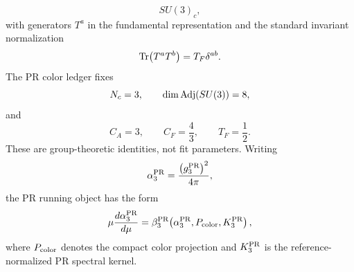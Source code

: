 \documentclass[11pt]{article}
\begin{document}
\begin{equation}
SU(3)_c,
\end{equation}
with generators \(T^a\) in the fundamental representation and the standard invariant normalization
\begin{equation}
{\rm Tr}\!\left(T^aT^b\right)
=
T_F\delta^{ab}.
\end{equation}
The PR color ledger fixes
\begin{equation}
N_c=3,
\qquad
{\rm dim}\,{\rm Adj}(SU(3))=8,
\end{equation}
and
\begin{equation}
C_A=3,
\qquad
C_F=\frac43,
\qquad
T_F=\frac12 .
\label{eq:priii-su3-invariants}
\end{equation}
These are group-theoretic identities, not fit parameters. Writing
\begin{equation}
\alpha_3^{\rm PR}
=
\frac{\left(g_3^{\rm PR}\right)^2}{4\pi},
\end{equation}
the PR running object has the form
\begin{equation}
\mu\frac{d\alpha_3^{\rm PR}}{d\mu}
=
\beta_3^{\rm PR}
\!\left(
\alpha_3^{\rm PR},
P_{\rm color},
K_3^{\rm PR}
\right),
\end{equation}
where \(P_{\rm color}\) denotes the compact color projection and \(K_3^{\rm PR}\) is the reference-normalized PR spectral kernel.
\end{document}
